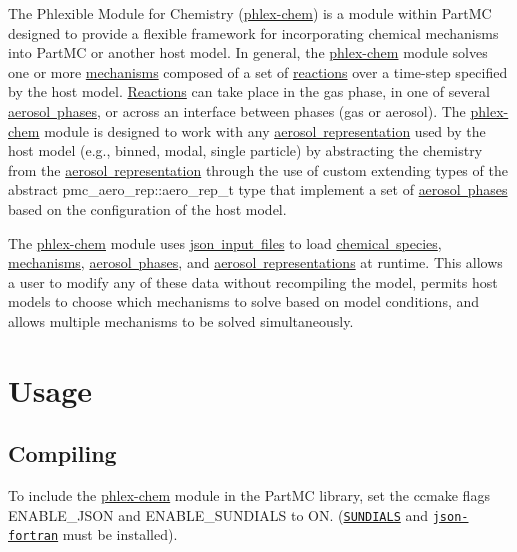 The Phlexible Module for Chemistry (\mbox{\hyperlink{phlex_chem}{phlex-\/chem}}) is a module within Part\+MC designed to provide a flexible framework for incorporating chemical mechanisms into Part\+MC or another host model. In general, the \mbox{\hyperlink{phlex_chem}{phlex-\/chem}} module solves one or more \mbox{\hyperlink{phlex_mechanism}{mechanisms}} composed of a set of \mbox{\hyperlink{phlex_rxn}{reactions}} over a time-\/step specified by the host model. \mbox{\hyperlink{phlex_rxn}{Reactions}} can take place in the gas phase, in one of several \mbox{\hyperlink{phlex_aero_phase}{aerosol phases}}, or across an interface between phases (gas or aerosol). The \mbox{\hyperlink{phlex_chem}{phlex-\/chem}} module is designed to work with any \mbox{\hyperlink{phlex_aero_rep}{aerosol representation}} used by the host model (e.\+g., binned, modal, single particle) by abstracting the chemistry from the \mbox{\hyperlink{phlex_aero_rep}{aerosol representation}} through the use of custom extending types of the abstract {\ttfamily pmc\+\_\+aero\+\_\+rep\+::aero\+\_\+rep\+\_\+t} type that implement a set of \mbox{\hyperlink{phlex_aero_phase}{aerosol phases}} based on the configuration of the host model.

The \mbox{\hyperlink{phlex_chem}{phlex-\/chem}} module uses \mbox{\hyperlink{input_format_ss_json}{json input files}} to load \mbox{\hyperlink{input_format_species}{chemical species}}, \mbox{\hyperlink{input_format_mechanism}{mechanisms}}, \mbox{\hyperlink{input_format_aero_phase}{aerosol phases}}, and \mbox{\hyperlink{input_format_aero_rep}{aerosol representations}} at runtime. This allows a user to modify any of these data without recompiling the model, permits host models to choose which mechanisms to solve based on model conditions, and allows multiple mechanisms to be solved simultaneously.

\section*{Usage}

\subsection*{Compiling}

To include the \mbox{\hyperlink{phlex_chem}{phlex-\/chem}} module in the Part\+MC library, set the ccmake flags {\ttfamily E\+N\+A\+B\+L\+E\+\_\+\+J\+S\+ON} and {\ttfamily E\+N\+A\+B\+L\+E\+\_\+\+S\+U\+N\+D\+I\+A\+LS} to {\ttfamily ON}. (\href{http://www.llnl.gov/casc/sundials/}{\tt S\+U\+N\+D\+I\+A\+LS} and \href{https://github.com/jacobwilliams/json-fortran}{\tt json-\/fortran} must be installed).

